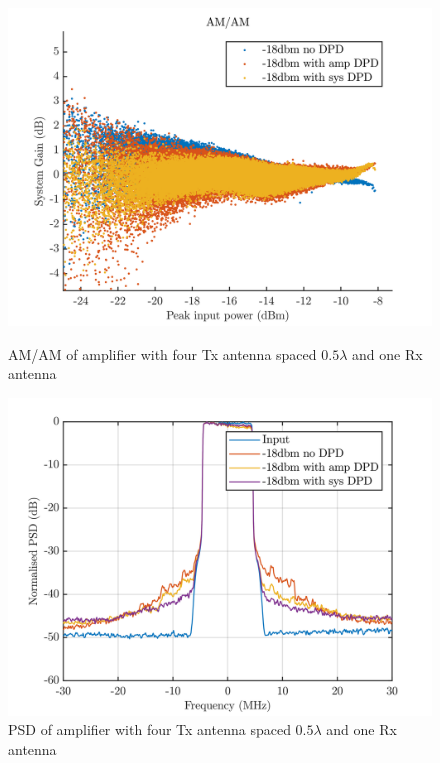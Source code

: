 \begin{figure}[H]
  \centering
  \begin{minipage}[b]{0.5\textwidth}
	\includegraphics[scale = 0.5]{figures/measurement/cree/four/amam_four_ant_0p5.png}
	\caption{AM/AM of amplifier with four Tx antenna spaced $0.5\lambda$ and one Rx antenna}
    \label{fig:cree_amam_four_ant4}
  \end{minipage}
  \hfill
  \begin{minipage}[b]{0.4\textwidth}
\includegraphics[scale = 0.5]{figures/measurement/cree/four/psd_four_ant_0p5.png}
\caption{PSD of amplifier with four Tx antenna spaced $0.5\lambda$ and one Rx antenna}
    \label{fig:cree_psd_four_ant4}
  \end{minipage}
\end{figure}

